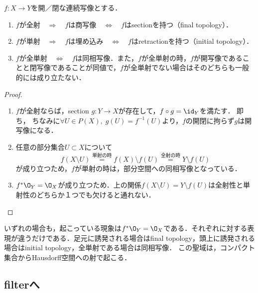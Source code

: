 \documentclass[uplatex,dvipdfmx]{jsreport}
\begin{document}
\begin{theorem}
    $f:X\to Y$を開／閉な連続写像とする．
    \begin{enumerate}
        \item $f$が全射$\quad\Rightarrow\quad f$は商写像$\quad\Leftrightarrow\quad f$はsectionを持つ（final topology）．
        \item $f$が単射$\quad\Rightarrow\quad f$は埋め込み$\quad\Leftrightarrow\quad f$はretractionを持つ（initial topology）．
        \item $f$が全単射$\quad\Leftrightarrow\quad f$は同相写像．また，$f$が全単射の時，$f$が開写像であることと閉写像であることが同値で，$f$が全単射でない場合はそのどちらも一般的には成り立たない．
    \end{enumerate}
\end{theorem}
\begin{proof}\mbox{}
    \begin{enumerate}
        \item $f$が全射ならば，section $g:Y\to X$が存在して，$f\circ g=\id_Y$を満たす．
        即ち，
        ちなみに$\forall U\in P(X),\;g(U)=f^{-1}(U)$より，$f$の開閉に拘らず$g$は開写像になる．
        \item 任意の部分集合$U\subset X$について\[f(X\setminus U)\overset{単射の時}{=}f(X)\setminus f(U)\overset{全射の時}{=}Y\setminus f(U)\]
        が成り立つため，$f$が単射の時は，部分空間への同相写像となっている．
        \item $f^*\O_Y=\O_X$が成り立つため．上の関係$f(X\setminus U)=Y\setminus f(U)$は全射性と単射性のどちらか１つでも欠けると通れない．
    \end{enumerate}
\end{proof}
\begin{remarks}
    いずれの場合も，起こっている現象は$f^*\O_Y=\O_X$である．それぞれに対する表現が違うだけである．足元に誘発される場合はfinal topology，頭上に誘発される場合はinitial topology，全単射である場合は同相写像．
    この聖域は，コンパクト集合からHausdorff空間への射で起こる．
\end{remarks}

\subsection{filterへ}
\end{document}
